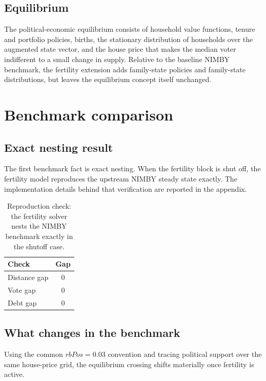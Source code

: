 \documentclass[11pt]{article}
\begin{document}
\subsection{Equilibrium}

The political-economic equilibrium consists of household value functions, tenure and portfolio
policies, births, the stationary distribution of households over the augmented state vector, and
the house price that makes the median voter indifferent to a small change in supply. Relative to
the baseline NIMBY benchmark, the fertility extension adds family-state policies and family-state
distributions, but leaves the equilibrium concept itself unchanged.

\section{Benchmark comparison}

\subsection{Exact nesting result}

The first benchmark fact is exact nesting. When the fertility block is shut off, the fertility
model reproduces the upstream NIMBY steady state exactly. The implementation details behind that
verification are reported in the appendix.

\begin{table}[htbp]
\centering
\begin{tabular}{lc}
\toprule
Check & Gap \\
\midrule
Distance gap & 0 \\
Vote gap & 0 \\
Debt gap & 0 \\
\bottomrule
\end{tabular}
\caption{Reproduction check: the fertility solver nests the NIMBY benchmark exactly in the shutoff case.}
\end{table}

\subsection{What changes in the benchmark}

Using the common $rbPos=0.03$ convention and tracing political support over the same house-price
grid, the equilibrium crossing shifts materially once fertility is active.
\end{document}

